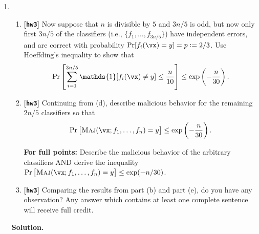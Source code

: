 \documentclass{article}
\def\1{\mathds{1}}
\def\hw{\textbf{[\texttt{hw3}]}\xspace}
\theoremstyle{definition}
\theoremstyle{remark}
\newenvironment{Q}
{%
\clearpage
\item
}
{%
\phantom{s} %
\bigskip
\textbf{Solution.}
}
\begin{document}
\begin{enumerate}[font={\Large\bfseries},left=0pt]
\begin{Q}
\begin{enumerate}
       \item \hw
         Now suppose that $n$ is divisible by $5$ and $3n/5$ is odd,
         but now only first $3n/5$ of the classifiers (i.e., $\{f_1,\ldots,f_{3n/5}\}$) have independent errors,
         and are correct with probability $\Pr[f_i(\vx) = y] = p:=2/3$. Use Hoeffding's inequality to show that 
                  \[
         \Pr\sbr{ \sum_{i=1}^{3n/5} \1[ f_i(\vx) \neq y] \leq \frac{n}{10} }\le
         \exp\del{ -\frac{n}{30}  }.
         \]
         
        \item \hw Continuing from (d), describe malicious behavior for the remaining $2n/5$ classifiers so that
        \[
        \Pr\sbr{ \maj(\vx;f_1,\ldots,f_n) = y } \leq \exp\del{ -\frac{n}{30}  }.
        \]
  
  \textbf{For full points:} Describe the malicious behavior of the arbitrary classifiers AND derive the inequality $\Pr\sbr{ \maj(\vx;f_1,\ldots,f_n) = y } \leq \exp(-n / 30)$.
  
 		\item \hw Comparing the results from part (b) and part (e), do you have any observation? Any answer which contains at least one complete sentence will receive full credit.
 		
  		 
 
         
     \end{enumerate}

\end{Q}
  


\end{enumerate}
\clearpage


\end{document}
